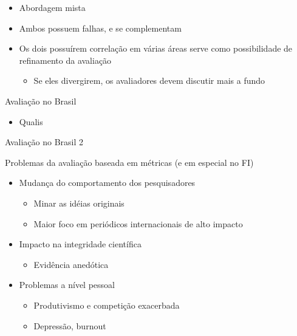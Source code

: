 \documentclass[bigger]{beamer}
\begin{document}
\begin{frame}[label={sec:orge3ff37e}]{\cite{butler2007}}
\begin{itemize}
\item Abordagem mista
\item Ambos possuem falhas, e se complementam
\item Os dois possuírem correlação em várias áreas serve como possibilidade de refinamento da avaliação
\begin{itemize}
\item Se eles divergirem, os avaliadores devem discutir mais a fundo
\end{itemize}
\end{itemize}
\end{frame}

\begin{frame}[label={sec:org6d01f49}]{Avaliação no Brasil}
\begin{itemize}
\item Qualis
\end{itemize}
\end{frame}


\begin{frame}[label={sec:org809c8d2}]{Avaliação no Brasil 2}
\end{frame}


\begin{frame}[label={sec:orgaff26df}]{Problemas da avaliação baseada em métricas (e em especial no FI)}
\begin{itemize}
\item Mudança do comportamento dos pesquisadores
\begin{itemize}
\item Minar as idéias originais
\item Maior foco em periódicos internacionais de alto impacto
\end{itemize}
\end{itemize}


\begin{itemize}
\item Impacto na integridade científica
\begin{itemize}
\item Evidência anedótica
\end{itemize}

\item Problemas a nível pessoal
\begin{itemize}
\item Produtivismo e competição exacerbada
\item Depressão, burnout
\end{itemize}
\end{itemize}
\end{frame}
\end{document}
